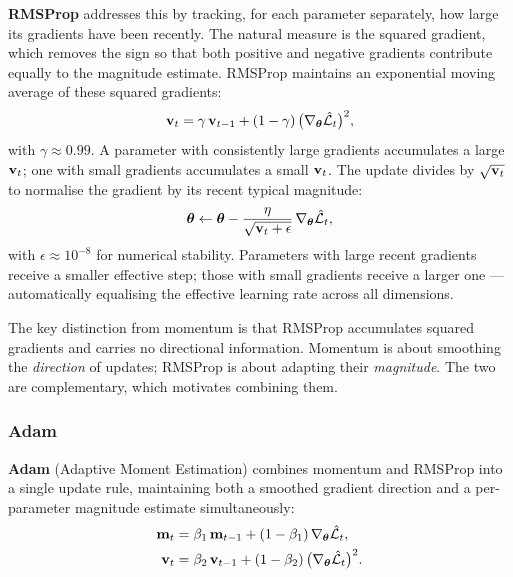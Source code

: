\textbf{RMSProp} addresses this by tracking, for each parameter separately, how large its gradients have been recently. The natural measure is the squared gradient, which removes the sign so that both positive and negative gradients contribute equally to the magnitude estimate. RMSProp maintains an exponential moving average of these squared gradients:
\begin{equation}
    \mathbf{v}_t = \gamma\, \mathbf{v}_{t-1} + (1-\gamma)\, \bigl(\nabla_{\boldsymbol{\theta}} \hat{\mathcal{L}}_t\bigr)^2,
\end{equation}
with $\gamma \approx 0.99$. A parameter with consistently large gradients accumulates a large $\mathbf{v}_t$; one with small gradients accumulates a small $\mathbf{v}_t$. The update divides by $\sqrt{\mathbf{v}_t}$ to normalise the gradient by its recent typical magnitude:
\begin{equation}
    \boldsymbol{\theta} \leftarrow \boldsymbol{\theta} - \frac{\eta}{\sqrt{\mathbf{v}_t + \epsilon}}\, \nabla_{\boldsymbol{\theta}} \hat{\mathcal{L}}_t,
\end{equation}
with $\epsilon \approx 10^{-8}$ for numerical stability. Parameters with large recent gradients receive a smaller effective step; those with small gradients receive a larger one — automatically equalising the effective learning rate across all dimensions.

The key distinction from momentum is that RMSProp accumulates squared gradients and carries no directional information. Momentum is about smoothing the \emph{direction} of updates; RMSProp is about adapting their \emph{magnitude}. The two are complementary, which motivates combining them.

\subsubsection{Adam}

\textbf{Adam} \parencite{kingma2015adam} (Adaptive Moment Estimation) combines momentum and RMSProp into a single update rule, maintaining both a smoothed gradient direction and a per-parameter magnitude estimate simultaneously:
\begin{align}
    \mathbf{m}_t &= \beta_1\, \mathbf{m}_{t-1} + (1-\beta_1)\, \nabla_{\boldsymbol{\theta}} \hat{\mathcal{L}}_t, \label{eq:adam_m}\\
    \mathbf{v}_t &= \beta_2\, \mathbf{v}_{t-1} + (1-\beta_2)\, \bigl(\nabla_{\boldsymbol{\theta}} \hat{\mathcal{L}}_t\bigr)^2. \label{eq:adam_v}
\end{align}

